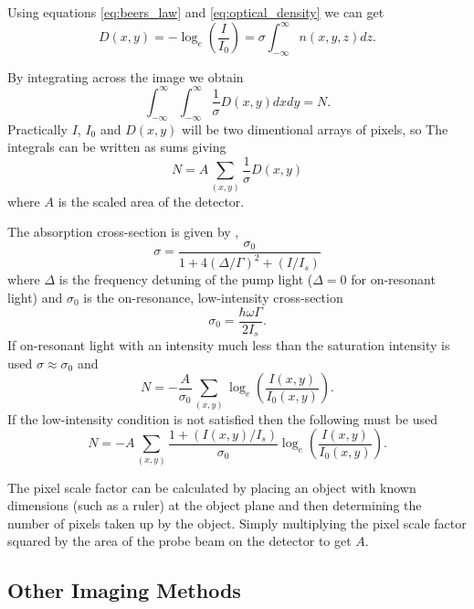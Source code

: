 Using equations \ref{eq:beers_law} and \ref{eq:optical_density} we can get
\begin{equation}
D(x, y) = -\log_e(\frac{I}{I_0}) = \sigma \int_{-\infty}^{\infty} n(x, y, z) dz.
\end{equation}

By integrating across the image we obtain
\begin{equation}
\int_{-\infty}^{\infty} \int_{-\infty}^{\infty} \frac{1}{\sigma}D(x, y) dx dy = N.
\end{equation}
Practically $I$, $I_0$ and $D(x, y)$ will be two dimentional arrays of pixels, so The integrals can be written as sums giving
\begin{equation}
N = A \sum_{(x, y)} \frac{1}{\sigma}D(x, y)
\end{equation}
where $A$ is the scaled area of the detector.

The absorption cross-section is given by \cite{steck_rubidium_2001},
\begin{equation}\label{eq:cross_section}
\sigma = \frac{\sigma_0}{1+4(\Delta/\Gamma)^2 + (I/I_s)}
\end{equation}
where $\Delta$ is the frequency detuning of the pump light ($\Delta=0$ for on-resonant light) and $\sigma_0$ is the on-resonance, low-intensity  cross-section
\begin{equation}
\sigma_0 = \frac{\hbar\omega\Gamma}{2I_s}.
\end{equation}
If on-resonant light with an intensity much less than the saturation intensity is used $\sigma \approx \sigma_0$ and
\begin{equation}
N = -\frac{A}{\sigma_0} \sum_{(x, y)} \log_e\left(\frac{I(x, y)}{I_0(x, y)}\right).
\end{equation}
If the low-intensity condition is not satisfied then the following must be used
\begin{equation}
N = -A \sum_{(x, y)} \frac{1+(I(x, y)/I_s)}{\sigma_0} \log_e\left(\frac{I(x, y)}{I_0(x, y)}\right).
\end{equation}

The pixel scale factor can be calculated by placing an object with known dimensions (such as a ruler) at the object plane and then determining the number of pixels taken up by the object. Simply multiplying the pixel scale factor squared by the area of the probe beam on the detector to get $A$.

\subsection{Other Imaging Methods}

